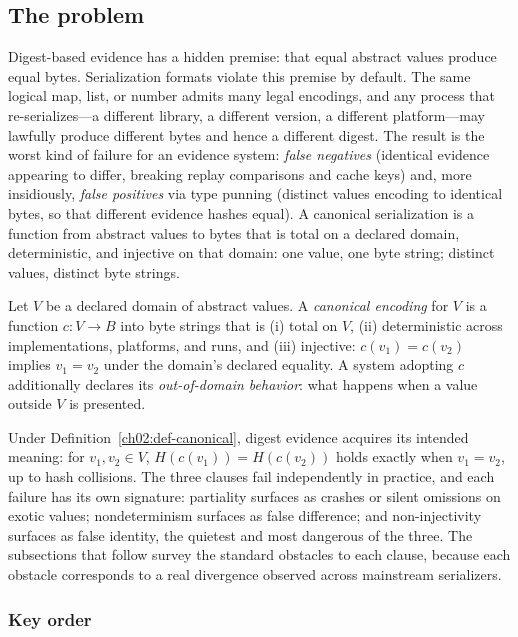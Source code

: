 \subsection{The problem}\label{ch02:canon-problem}

Digest-based evidence has a hidden premise: that equal abstract values
produce equal bytes. Serialization formats violate this premise by
default. The same logical map, list, or number admits many legal
encodings, and any process that re-serializes---a different library, a
different version, a different platform---may lawfully produce
different bytes and hence a different digest. The result is the worst
kind of failure for an evidence system: \emph{false negatives}
(identical evidence appearing to differ, breaking replay comparisons
and cache keys) and, more insidiously, \emph{false positives} via type
punning (distinct values encoding to identical bytes, so that
different evidence hashes equal). A canonical serialization is a
function from abstract values to bytes that is total on a declared
domain, deterministic, and injective on that domain: one value, one
byte string; distinct values, distinct byte strings.

\begin{definition}\label{ch02:def-canonical}
Let $V$ be a declared domain of abstract values. A \emph{canonical
encoding} for $V$ is a function $c : V \to B$ into byte strings that
is (i) total on $V$, (ii) deterministic across implementations,
platforms, and runs, and (iii) injective: $c(v_1) = c(v_2)$ implies
$v_1 = v_2$ under the domain's declared equality. A system adopting
$c$ additionally declares its \emph{out-of-domain behavior}: what
happens when a value outside $V$ is presented.
\end{definition}

Under Definition~\ref{ch02:def-canonical}, digest evidence acquires
its intended meaning: for $v_1, v_2 \in V$, $H(c(v_1)) = H(c(v_2))$
holds exactly when $v_1 = v_2$, up to hash collisions. The three
clauses fail independently in practice, and each failure has its own
signature: partiality surfaces as crashes or silent omissions on
exotic values; nondeterminism surfaces as false difference; and
non-injectivity surfaces as false identity, the quietest and most
dangerous of the three. The subsections that follow survey the
standard obstacles to each clause, because each obstacle corresponds
to a real divergence observed across mainstream serializers.

\subsubsection{Key order}\label{ch02:canon-keys}


